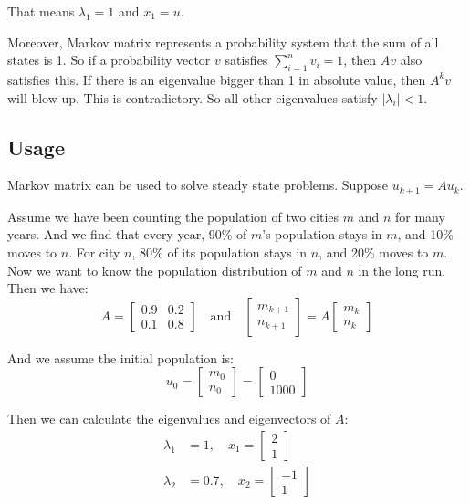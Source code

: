 \documentclass[10pt,a4paper,oneside,numbers=noenddot]{scrbook}
\theoremstyle{ctplain}
\theoremstyle{ctresult}
\begin{document}
That means $\lambda_1 = 1$ and $x_1 = u$.

Moreover, Markov matrix represents a probability system that the sum of all states is 1.
So if a probability vector $v$ satisfies $\sum_{i=1}^{n} v_i = 1$, then $Av$ also
satisfies this. If there is an eigenvalue bigger than 1 in absolute value, then $A^k v$
will blow up. This is contradictory. So all other eigenvalues satisfy $|\lambda_i| < 1$.

\subsection{Usage}

Markov matrix can be used to solve steady state problems. Suppose $u_{k+1} = Au_k$.

Assume we have been counting the population of two cities $m$ and $n$ for many years.
And we find that every year, 90\% of $m$'s population stays in $m$, and 10\% moves to
$n$. For city $n$, 80\% of its population stays in $n$, and 20\% moves to $m$. Now we
want to know the population distribution of $m$ and $n$ in the long run. Then we have:
\[
  A = \begin{bmatrix}
    0.9 & 0.2 \\
    0.1 & 0.8
  \end{bmatrix}
  \quad \text{and} \quad
  \begin{bmatrix}
    m_{k+1} \\
    n_{k+1}
  \end{bmatrix} =
  A \begin{bmatrix}
    m_k \\
    n_k
  \end{bmatrix}
\]

And we assume the initial population is:
\[
  u_0 = \begin{bmatrix}
    m_0 \\
    n_0
  \end{bmatrix} =
  \begin{bmatrix}
    0 \\
    1000
  \end{bmatrix}
\]

Then we can calculate the eigenvalues and eigenvectors of $A$:
\begin{align*}
  \lambda_1 &= 1, \quad x_1 = \begin{bmatrix} 2 \\ 1 \end{bmatrix} \\
  \lambda_2 &= 0.7, \quad x_2 = \begin{bmatrix} -1 \\ 1 \end{bmatrix}
\end{align*}
\end{document}
